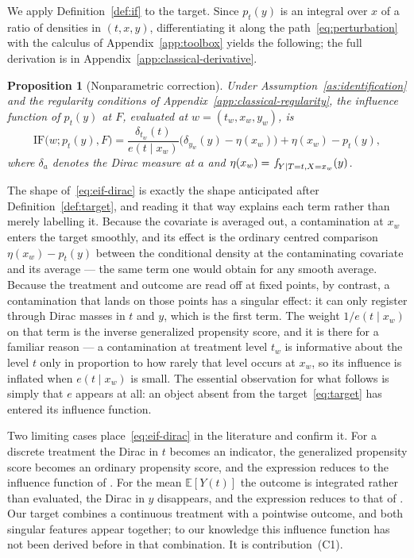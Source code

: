 \documentclass[11pt]{article}
\theoremstyle{plain}
\newtheorem{mypropo}{Proposition}
\theoremstyle{definition}
\theoremstyle{remark}
\newcommand{\pE}{\ensuremath{\mathbb{E}}}
\newcommand{\pf}[1]{\ensuremath{\,\mathlarger{\textit{f}}_{#1}}}
\newcommand{\IF}{\mathrm{IF}}
\newcommand{\gps}{e}
\begin{document}
We apply Definition~\ref{def:if} to the target. Since $p_t(y)$ is an integral over $x$ of a
ratio of densities in $(t,x,y)$, differentiating it along the path~\eqref{eq:perturbation}
with the calculus of Appendix~\ref{app:toolbox} yields the following; the full derivation is in
Appendix~\ref{app:classical-derivative}.

\begin{mypropo}[Nonparametric correction]
\label{prop:eif}
Under Assumption~\ref{as:identification} and the regularity conditions of
Appendix~\ref{app:classical-regularity}, the influence function of $p_t(y)$ at $F$, evaluated
at $w = (t_w,x_w,y_w)$, is
\begin{equation}
\IF\big(w; p_t(y), F\big)
= \frac{\delta_{t_w}(t)}{\gps(t \mid x_w)}
\Big( \delta_{y_w}(y) - \eta(x_w) \Big)
+ \eta(x_w) - p_t(y),
\label{eq:eif-dirac}
\end{equation}
where $\delta_a$ denotes the Dirac measure at $a$ and $\eta(x_w)=\pf{Y\mid T=t,X=x_w}(y)$.
\end{mypropo}

The shape of~\eqref{eq:eif-dirac} is exactly the shape anticipated after
Definition~\ref{def:target}, and reading it that way explains each term rather than merely
labelling it. Because the covariate is averaged out, a contamination at $x_w$ enters the
target smoothly, and its effect is the ordinary centred comparison $\eta(x_w) - p_t(y)$
between the conditional density at the contaminating covariate and its average --- the same
term one would obtain for any smooth average. Because the treatment and outcome are read off
at fixed points, by contrast, a contamination that lands on those points has a singular
effect: it can only register through Dirac masses in $t$ and $y$, which is the first term.
The weight $1/\gps(t\mid x_w)$ on that term is the inverse generalized propensity score, and
it is there for a familiar reason --- a contamination at treatment level $t_w$ is informative
about the level $t$ only in proportion to how rarely that level occurs at $x_w$, so its
influence is inflated when $\gps(t\mid x_w)$ is small. The essential observation for what
follows is simply that $\gps$ appears at all: an object absent from the
target~\eqref{eq:target} has entered its influence function.

Two limiting cases place~\eqref{eq:eif-dirac} in the literature and confirm it. For a discrete
treatment the Dirac in $t$ becomes an indicator, the generalized propensity score becomes an
ordinary propensity score, and the expression reduces to the influence function of
\citet{kennedy2023density}. For the mean $\pE[Y(t)]$ the outcome is integrated rather than
evaluated, the Dirac in $y$ disappears, and the expression reduces to that of
\citet{kennedy2017continuous}. Our target combines a continuous treatment with a pointwise
outcome, and both singular features appear together; to our knowledge this influence function
has not been derived before in that combination. It is contribution~(C1).
\end{document}
